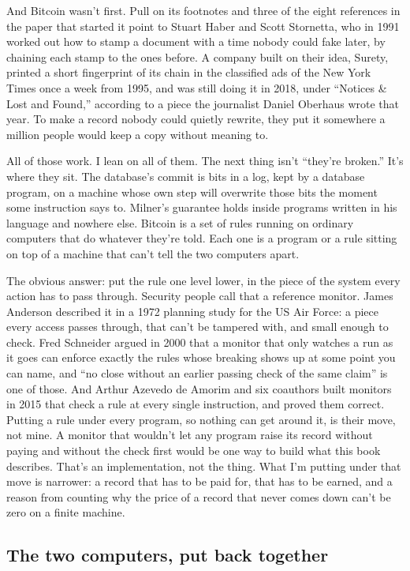 \documentclass[11pt,twoside]{article}
\theoremstyle{thielethm}
\theoremstyle{thieledef}
\theoremstyle{thieledef}
\theoremstyle{thieledef}
\theoremstyle{thielethm}
\theoremstyle{thieleobs}
\theoremstyle{thielethm}
\begin{document}
And Bitcoin wasn't first. Pull on its footnotes and three of the eight references in the paper that started it point to Stuart Haber and Scott Stornetta, who in 1991 worked out how to stamp a document with a time nobody could fake later, by chaining each stamp to the ones before. A company built on their idea, Surety, printed a short fingerprint of its chain in the classified ads of the New York Times once a week from 1995, and was still doing it in 2018, under ``Notices \& Lost and Found,'' according to a piece the journalist Daniel Oberhaus wrote that year. To make a record nobody could quietly rewrite, they put it somewhere a million people would keep a copy without meaning to.

All of those work. I lean on all of them. The next thing isn't ``they're broken.'' It's where they sit. The database's commit is bits in a log, kept by a database program, on a machine whose own step will overwrite those bits the moment some instruction says to. Milner's guarantee holds inside programs written in his language and nowhere else. Bitcoin is a set of rules running on ordinary computers that do whatever they're told. Each one is a program or a rule sitting on top of a machine that can't tell the two computers apart.

The obvious answer: put the rule one level lower, in the piece of the system every action has to pass through. Security people call that a reference monitor. James Anderson described it in a 1972 planning study for the US Air Force: a piece every access passes through, that can't be tampered with, and small enough to check. Fred Schneider argued in 2000 that a monitor that only watches a run as it goes can enforce exactly the rules whose breaking shows up at some point you can name, and ``no close without an earlier passing check of the same claim'' is one of those. And Arthur Azevedo de Amorim and six coauthors built monitors in 2015 that check a rule at every single instruction, and proved them correct. Putting a rule under every program, so nothing can get around it, is their move, not mine. A monitor that wouldn't let any program raise its record without paying and without the check first would be one way to build what this book describes. That's an implementation, not the thing. What I'm putting under that move is narrower: a record that has to be paid for, that has to be earned, and a reason from counting why the price of a record that never comes down can't be zero on a finite machine.

\subsection{The two computers, put back together}
\end{document}
